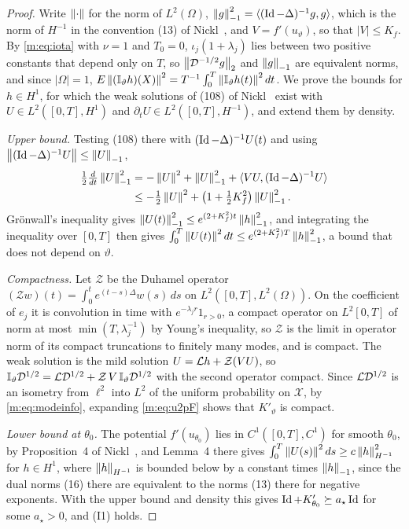 \begin{proof}
Write $\left\|\cdot\right\|$ for the norm of $L^2(\Omega)$, $\left\|g\right\|^2_{-1}=\langle(\operatorname{Id}-\Delta)^{-1}g,g\rangle$, which is the norm of $H^{-1}$ in the convention (13) of Nickl~\cite{nicklbvm2024}, and $V=f'(u_\vartheta)$, so that $|V|\le K_f$. By \eqref{m:eq:iota} with $\nu=1$ and $T_0=0$, $\iota_j(1+\lambda_j)$ lies between two positive constants that depend only on $T$, so $\left\|\mathcal D^{-1/2}g\right\|_2$ and $\left\|g\right\|_{-1}$ are equivalent norms, and since $|\Omega|=1$, $E\left\|(\mathbb{I}_\vartheta h)(X)\right\|^2=T^{-1}\int_0^T\left\|\mathbb{I}_\vartheta h(t)\right\|^2dt$. We prove the bounds for $h\in H^1$, for which the weak solutions of (108) of Nickl~\cite{nicklbvm2024} exist with $U\in L^2([0,T],H^1)$ and $\partial_tU\in L^2([0,T],H^{-1})$, and extend them by density.

\emph{Upper bound.} Testing (108) there with $(\operatorname{Id}-\Delta)^{-1}U(t)$ and using $\left\|(\operatorname{Id}-\Delta)^{-1}U\right\|\le\left\|U\right\|_{-1}$,
\[
\begin{aligned}
\tfrac12\tfrac d{dt}\left\|U\right\|^2_{-1}&=-\left\|U\right\|^2+\left\|U\right\|^2_{-1}+\langle VU,(\operatorname{Id}-\Delta)^{-1}U\rangle\\
&\le-\tfrac12\left\|U\right\|^2+\big(1+\tfrac12K_f^2\big)\left\|U\right\|^2_{-1} .
\end{aligned}
\]
Gr\"onwall's inequality gives $\left\|U(t)\right\|^2_{-1}\le e^{(2+K_f^2)t}\left\|h\right\|^2_{-1}$, and integrating the inequality over $[0,T]$ then gives $\int_0^T\left\|U(t)\right\|^2dt\le e^{(2+K_f^2)T}\left\|h\right\|^2_{-1}$, a bound that does not depend on $\vartheta$.

\emph{Compactness.} Let $\mathcal Z$ be the Duhamel operator $(\mathcal Zw)(t)=\int_0^te^{(t-s)\Delta}w(s)\,ds$ on $L^2([0,T],L^2(\Omega))$. On the coefficient of $e_j$ it is convolution in time with $e^{-\lambda_jr}1_{r>0}$, a compact operator on $L^2[0,T]$ of norm at most $\min(T,\lambda_j^{-1})$ by Young's inequality, so $\mathcal Z$ is the limit in operator norm of its compact truncations to finitely many modes, and is compact. The weak solution is the mild solution $U=\mathcal{L} h+\mathcal Z(VU)$, so $\mathbb{I}_\vartheta\mathcal D^{1/2}=\mathcal{L}\mathcal D^{1/2}+\mathcal Z\,V\,\mathbb{I}_\vartheta\mathcal D^{1/2}$ with the second operator compact. Since $\mathcal{L}\mathcal D^{1/2}$ is an isometry from $\ell^2$ into $L^2$ of the uniform probability on $\mathcal X$, by \eqref{m:eq:modeinfo}, expanding \eqref{m:eq:u2pF} shows that $K'_\vartheta$ is compact.

\emph{Lower bound at $\theta_0$.} The potential $f'(u_{\theta_0})$ lies in $C^1([0,T],C^1)$ for smooth $\theta_0$, by Proposition~4 of Nickl~\cite{nicklbvm2024}, and Lemma~4 there gives $\int_0^T\left\|U(s)\right\|^2ds\ge c\left\|h\right\|^2_{H^{-1}}$ for $h\in H^1$, where $\left\|h\right\|_{H^{-1}}$ is bounded below by a constant times $\left\|h\right\|_{-1}$, since the dual norms (16) there are equivalent to the norms (13) there for negative exponents. With the upper bound and density this gives $\operatorname{Id}+K'_{\theta_0}\succeq a_\star\operatorname{Id}$ for some $a_\star>0$, and (I1) holds.


\end{proof}
